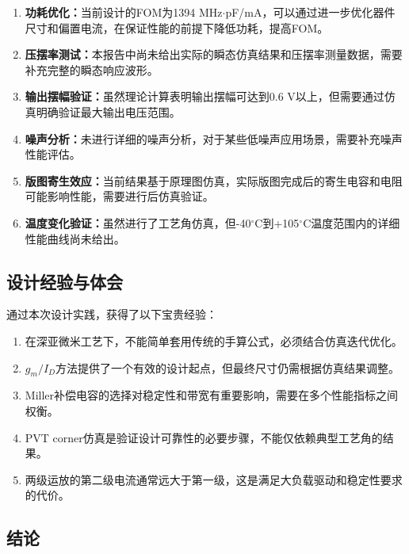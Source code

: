 \documentclass[UTF8,12pt,a4paper]{ctexart}
\begin{document}
\begin{enumerate}
    \item \textbf{功耗优化：}当前设计的FOM为1394 MHz$\cdot$pF/mA，可以通过进一步优化器件尺寸和偏置电流，在保证性能的前提下降低功耗，提高FOM。
    
    \item \textbf{压摆率测试：}本报告中尚未给出实际的瞬态仿真结果和压摆率测量数据，需要补充完整的瞬态响应波形。
    
    \item \textbf{输出摆幅验证：}虽然理论计算表明输出摆幅可达到0.6 V以上，但需要通过仿真明确验证最大输出电压范围。
    
    \item \textbf{噪声分析：}未进行详细的噪声分析，对于某些低噪声应用场景，需要补充噪声性能评估。
    
    \item \textbf{版图寄生效应：}当前结果基于原理图仿真，实际版图完成后的寄生电容和电阻可能影响性能，需要进行后仿真验证。
    
    \item \textbf{温度变化验证：}虽然进行了工艺角仿真，但-40$^\circ$C到+105$^\circ$C温度范围内的详细性能曲线尚未给出。
\end{enumerate}

\subsection{设计经验与体会}

通过本次设计实践，获得了以下宝贵经验：

\begin{enumerate}
    \item 在深亚微米工艺下，不能简单套用传统的手算公式，必须结合仿真迭代优化。
    
    \item $g_m/I_D$方法提供了一个有效的设计起点，但最终尺寸仍需根据仿真结果调整。
    
    \item Miller补偿电容的选择对稳定性和带宽有重要影响，需要在多个性能指标之间权衡。
    
    \item PVT corner仿真是验证设计可靠性的必要步骤，不能仅依赖典型工艺角的结果。
    
    \item 两级运放的第二级电流通常远大于第一级，这是满足大负载驱动和稳定性要求的代价。
\end{enumerate}

\subsection{结论}
\end{document}
